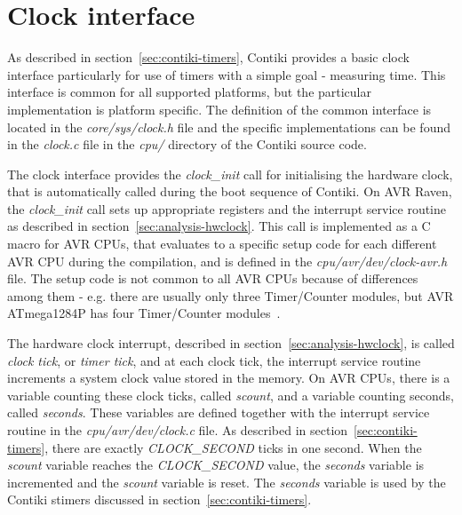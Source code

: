 
\section{Clock interface}\label{sec:analysis-clock-interface}
As described in section~\ref{sec:contiki-timers},
Contiki provides a basic clock interface particularly for use of timers
with a simple goal - measuring time.
This interface is common for all supported platforms,
but the particular implementation is platform specific.
The definition of the common interface is located in the {\it{core/sys/clock.h}} file
and the specific implementations can be found in the {\it{clock.c}} file
in the {\it{cpu/}} directory of the Contiki source code.

The clock interface provides the {\it{clock\_init}} call for initialising the hardware clock,
that is automatically called during the boot sequence of Contiki.
On AVR Raven, the {\it{clock\_init}} call sets up
appropriate registers and the interrupt service routine as described in section~\ref{sec:analysis-hwclock}.
This call is implemented as a C macro for AVR CPUs, that evaluates to a specific setup code for each
different AVR CPU during the compilation, and is defined in the {\it{cpu/avr/dev/clock-avr.h}} file.
The setup code is not common to all AVR CPUs because of differences among them - e.g. there are usually
only three Timer/Counter modules, but AVR ATmega1284P has four Timer/Counter modules~\cite{avr-datasheet}.

The hardware clock interrupt, described in section~\ref{sec:analysis-hwclock},
is called {\it{clock tick}}, or {\it{timer tick}}, and at each clock tick, the interrupt service routine increments
a system clock value stored in the memory.
On AVR CPUs, there is a variable counting these clock ticks, called {\it{scount}},
and a variable counting seconds, called {\it{seconds}}.
These variables are defined together with the interrupt service routine in the {\it{cpu/avr/dev/clock.c}} file.
As described in section~\ref{sec:contiki-timers}, there are exactly {\it{CLOCK\_SECOND}} ticks in one second.
When the {\it{scount}} variable reaches the {\it{CLOCK\_SECOND}} value,
the {\it{seconds}} variable is incremented and the {\it{scount}} variable is reset.
The {\it{seconds}} variable is used by the Contiki stimers discussed in section~\ref{sec:contiki-timers}.

